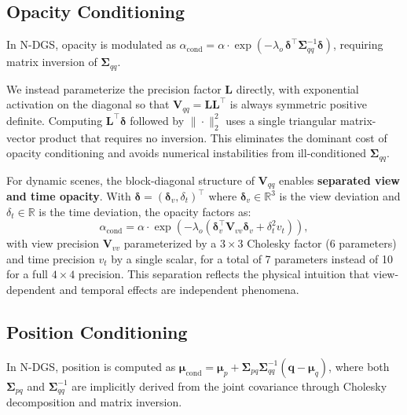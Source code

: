 \documentclass{article}
\theoremstyle{plain}
\theoremstyle{definition}
\theoremstyle{remark}
\begin{document}
\subsection{Opacity Conditioning}

In N-DGS, opacity is modulated as $\alpha_{\text{cond}} = \alpha\cdot\exp(-\lambda_o\,\boldsymbol{\delta}^\top \boldsymbol{\Sigma}_{qq}^{-1}\boldsymbol{\delta})$, requiring matrix inversion of $\boldsymbol{\Sigma}_{qq}$.

We instead parameterize the precision factor $\mathbf{L}$ directly, with exponential activation on the diagonal so that $\mathbf{V}_{qq} = \mathbf{L}\mathbf{L}^\top$ is always symmetric positive definite. Computing $\mathbf{L}^\top\boldsymbol{\delta}$ followed by $\|\cdot\|_2^2$ uses a single triangular matrix-vector product that requires no inversion. This eliminates the dominant cost of opacity conditioning and avoids numerical instabilities from ill-conditioned $\boldsymbol{\Sigma}_{qq}$.

For dynamic scenes, the block-diagonal structure of $\mathbf{V}_{qq}$ enables \textbf{separated view and time opacity}. With $\boldsymbol{\delta} = (\boldsymbol{\delta}_v, \delta_t)^\top$ where $\boldsymbol{\delta}_v \in \mathbb{R}^3$ is the view deviation and $\delta_t \in \mathbb{R}$ is the time deviation, the opacity factors as:
\begin{equation}
\alpha_{\text{cond}} = \alpha \cdot \exp\!\left(-\lambda_o\left(\boldsymbol{\delta}_v^\top \mathbf{V}_{vv} \boldsymbol{\delta}_v + \delta_t^2 v_t\right)\right),
\end{equation}
with view precision $\mathbf{V}_{vv}$ parameterized by a $3 \times 3$ Cholesky factor (6 parameters) and time precision $v_t$ by a single scalar, for a total of 7 parameters instead of 10 for a full $4 \times 4$ precision. This separation reflects the physical intuition that view-dependent and temporal effects are independent phenomena.

\subsection{Position Conditioning}
\label{subsec:position}

In N-DGS, position is computed as $\boldsymbol{\mu}_{\text{cond}} = \boldsymbol{\mu}_p + \boldsymbol{\Sigma}_{pq}\boldsymbol{\Sigma}_{qq}^{-1}(\mathbf{q}-\boldsymbol{\mu}_q)$, where both $\boldsymbol{\Sigma}_{pq}$ and $\boldsymbol{\Sigma}_{qq}^{-1}$ are implicitly derived from the joint covariance through Cholesky decomposition and matrix inversion.
\end{document}
